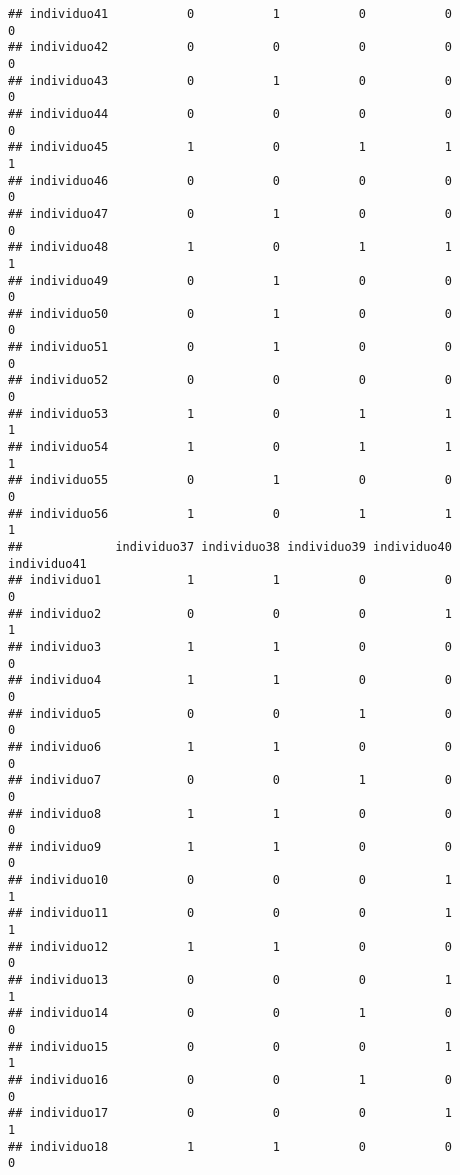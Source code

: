 \documentclass[
]{article}
\begin{document}
\begin{verbatim}
## individuo41           0           1           0           0           0
## individuo42           0           0           0           0           0
## individuo43           0           1           0           0           0
## individuo44           0           0           0           0           0
## individuo45           1           0           1           1           1
## individuo46           0           0           0           0           0
## individuo47           0           1           0           0           0
## individuo48           1           0           1           1           1
## individuo49           0           1           0           0           0
## individuo50           0           1           0           0           0
## individuo51           0           1           0           0           0
## individuo52           0           0           0           0           0
## individuo53           1           0           1           1           1
## individuo54           1           0           1           1           1
## individuo55           0           1           0           0           0
## individuo56           1           0           1           1           1
##             individuo37 individuo38 individuo39 individuo40 individuo41
## individuo1            1           1           0           0           0
## individuo2            0           0           0           1           1
## individuo3            1           1           0           0           0
## individuo4            1           1           0           0           0
## individuo5            0           0           1           0           0
## individuo6            1           1           0           0           0
## individuo7            0           0           1           0           0
## individuo8            1           1           0           0           0
## individuo9            1           1           0           0           0
## individuo10           0           0           0           1           1
## individuo11           0           0           0           1           1
## individuo12           1           1           0           0           0
## individuo13           0           0           0           1           1
## individuo14           0           0           1           0           0
## individuo15           0           0           0           1           1
## individuo16           0           0           1           0           0
## individuo17           0           0           0           1           1
## individuo18           1           1           0           0           0

\end{verbatim}
\end{document}
